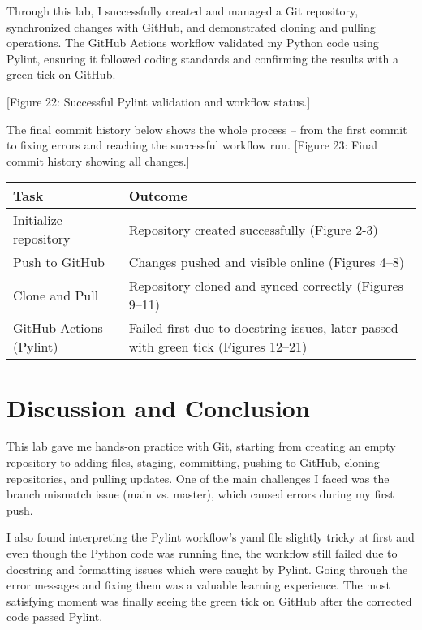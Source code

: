 \documentclass[10pt,a4paper]{report}
\begin{document}
Through this lab, I successfully created and managed a Git repository, synchronized changes with GitHub, and demonstrated cloning and pulling operations. The GitHub Actions workflow validated my Python code using Pylint, ensuring it followed coding standards and confirming the results with a green tick on GitHub.

[Figure 22: Successful Pylint validation and workflow status.]

The final commit history below shows the whole process -- from the first commit to fixing errors and reaching the successful workflow run.
[Figure 23: Final commit history showing all changes.]


\begin{center}
\begin{tabular}{|p{4cm}|p{9cm}|}
\hline
\textbf{Task} & \textbf{Outcome} \\
\hline
Initialize repository & Repository created successfully (Figure 2-3) \\
Push to GitHub & Changes pushed and visible online (Figures 4–8) \\
Clone and Pull & Repository cloned and synced correctly (Figures 9–11) \\
GitHub Actions (Pylint) & Failed first due to docstring issues, later passed with green tick (Figures 12–21) \\
\hline
\end{tabular}
\end{center}




\section{Discussion and Conclusion}

This lab gave me hands-on practice with Git, starting from creating an empty repository to adding files, staging, committing, pushing to GitHub, cloning repositories, and pulling updates. One of the main challenges I faced was the branch mismatch issue (main vs. master), which caused errors during my first push.

I also found interpreting the Pylint workflow's yaml file slightly tricky at first and even though the Python code was running fine, the workflow still failed due to docstring and formatting issues which were caught by Pylint. Going through the error messages and fixing them was a valuable learning experience. The most satisfying moment was finally seeing the green tick on GitHub after the corrected code passed Pylint.
\end{document}
